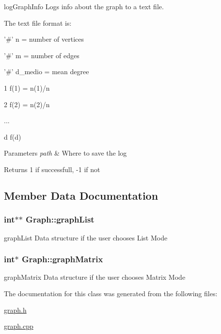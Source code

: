 log\-Graph\-Info Logs info about the graph to a text file. 

The text file format is\-: \par
'\#' n = number of vertices \par
'\#' m = number of edges \par
'\#' d\-\_\-medio = mean degree \par
1 f(1) = n(1)/n \par
2 f(2) = n(2)/n \par
... \par
d f(d) \par
 
\begin{DoxyParams}{Parameters}
{\em path} & Where to save the log \\
\hline
\end{DoxyParams}
\begin{DoxyReturn}{Returns}
1 if successfull, -\/1 if not 
\end{DoxyReturn}


\subsection{Member Data Documentation}
\hypertarget{classGraph_abb26e5219f026636b1bb81f195a9e62d}{
\subsubsection[{graph\-List}]{\setlength{\rightskip}{0pt plus 5cm}int$\ast$$\ast$ Graph\-::graph\-List\hspace{0.3cm}{\ttfamily [private]}}}\label{classGraph_abb26e5219f026636b1bb81f195a9e62d}


graph\-List Data structure if the user chooses List Mode 

\hypertarget{classGraph_a8a8f6f6dc0d558fb187c23d504664e56}{
\subsubsection[{graph\-Matrix}]{\setlength{\rightskip}{0pt plus 5cm}int$\ast$ Graph\-::graph\-Matrix\hspace{0.3cm}{\ttfamily [private]}}}\label{classGraph_a8a8f6f6dc0d558fb187c23d504664e56}


graph\-Matrix Data structure if the user chooses Matrix Mode 



The documentation for this class was generated from the following files\-:\begin{DoxyCompactItemize}
\item 
\hyperlink{graph_8h}{graph.\-h}\item 
\hyperlink{graph_8cpp}{graph.\-cpp}\end{DoxyCompactItemize}
